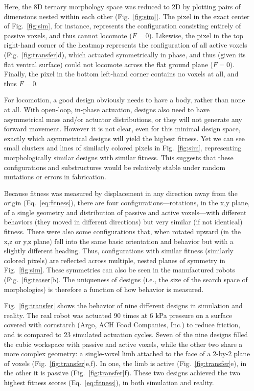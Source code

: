 


Here, the 8D ternary morphology space was reduced to 2D by plotting pairs of dimensions nested within each other (Fig.~\ref{fig:sim}).
The pixel in the exact center of Fig.~\ref{fig:sim}, for instance, represents the configuration consisting entirely of passive voxels, and thus cannot locomote ($F=0$).
Likewise, the pixel in the top right-hand corner of the heatmap represents the configuration of all active voxels (Fig.~\ref{fig:transfer}d), which actuated symmetrically in phase, and thus (given its flat ventral surface) could not locomote across the flat ground plane ($F=0$).
Finally, the pixel in the bottom left-hand corner contains no voxels at all, and thus $F=0$.


For locomotion, a good design obviously needs to have a body, rather than none at all.
With open-loop, in-phase actuation, designs also need to have asymmetrical mass and/or actuator distributions, or they will not generate any forward movement.
However it is not clear, even for this minimal design space, exactly which asymmetrical designs will yield the highest fitness.
Yet we can see small clusters and lines of similarly colored pixels in Fig.~\ref{fig:sim}, representing morphologically similar designs with similar fitness.
This suggests that these configurations and substructures would be relatively stable under random mutations or errors in fabrication.


Because fitness was measured by displacement in any direction away from the origin (Eq.~\ref{eq:fitness}), there are four configurations---rotations, in the x,y plane, of a single geometry and distribution of passive and active voxels---with different behaviors (they moved in different directions) but very similar (if not identical) fitness.
There were also some configurations that, when rotated upward (in the x,z or y,z plane) fell into the same basic orientation and behavior but with a slightly different heading.
Thus, configurations with similar fitness (similarly colored pixels) are reflected across multiple, nested planes of symmetry in Fig.~\ref{fig:sim}.
These symmetries can also be seen in the manufactured robots (Fig.~\ref{fig:teaser}b).
The uniqueness of designs (i.e., the size of the search space of morphologies) is therefore a function of how behavior is measured.


 



Fig.~\ref{fig:transfer} shows the behavior of nine different designs in simulation and reality.
The real robot was actuated 90 times at 6 kPa pressure on a surface covered with cornstarch 
(Argo\textregistered, ACH Food Companies, Inc.) 
to reduce friction, and is compared to 23 simulated actuation cycles.
Seven of the nine designs filled the cubic workspace with passive and active voxels, while the other two share a more complex geometry: a single-voxel limb attached to the face of a 2-by-2 plane of voxels (Fig.~\ref{fig:transfer}e,f).
In one, the limb is active (Fig.~\ref{fig:transfer}e), in the other it is passive (Fig.~\ref{fig:transfer}f).
These two designs achieved the two highest fitness scores (Eq.~\ref{eq:fitness}), in both simulation and reality.

